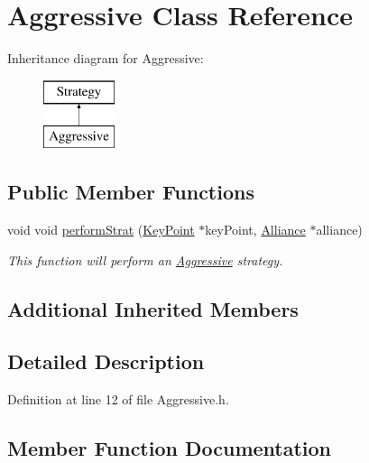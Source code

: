 \hypertarget{classAggressive}{}\section{Aggressive Class Reference}
\label{classAggressive}
Inheritance diagram for Aggressive\+:\begin{figure}[H]
\begin{center}
\leavevmode
\includegraphics[height=2.000000cm]{classAggressive}
\end{center}
\end{figure}
\subsection*{Public Member Functions}
\begin{DoxyCompactItemize}
\item 
void void \hyperlink{classAggressive_a84122a24be95be256f9992c21127b0d1}{perform\+Strat} (\hyperlink{classKeyPoint}{Key\+Point} $\ast$key\+Point, \hyperlink{classAlliance}{Alliance} $\ast$alliance)
\begin{DoxyCompactList}\small\item\em This function will perform an \hyperlink{classAggressive}{Aggressive} strategy. \end{DoxyCompactList}\end{DoxyCompactItemize}
\subsection*{Additional Inherited Members}


\subsection{Detailed Description}


Definition at line 12 of file Aggressive.\+h.



\subsection{Member Function Documentation}
\mbox{\label{classAggressive_a84122a24be95be256f9992c21127b0d1}} 
